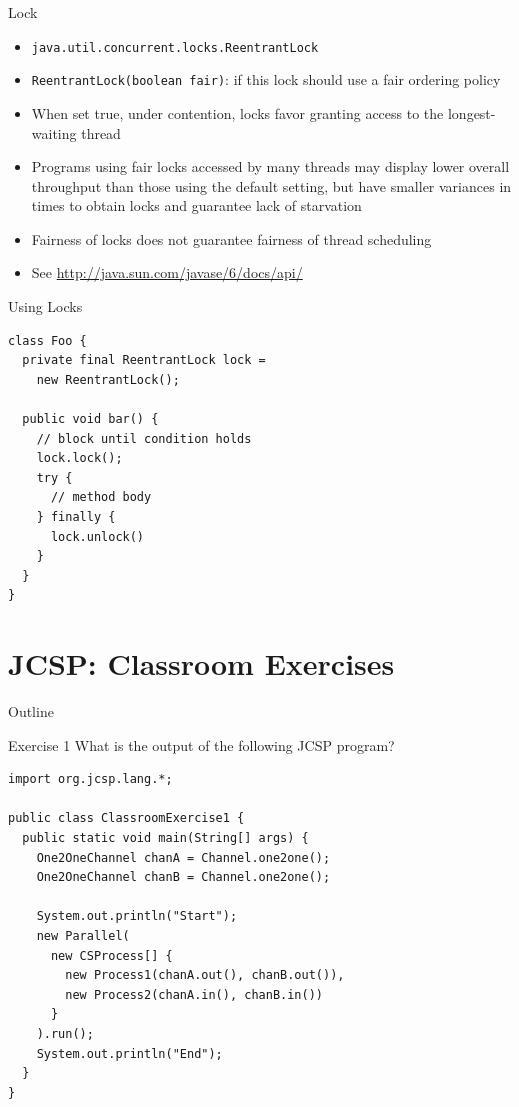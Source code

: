 \begin{frame}[fragile]{Lock}
  \begin{itemize}
  \item \lstinline!java.util.concurrent.locks.ReentrantLock!
  \item \lstinline!ReentrantLock(boolean fair)!: if this lock should
    use a fair ordering policy
  \item When set true, under contention, locks favor granting access
    to the longest-waiting thread
  \item Programs using fair locks accessed by many threads may display
    lower overall throughput than those using the default setting, but
    have smaller variances in times to obtain locks and guarantee lack
    of starvation
  \item Fairness of locks does not guarantee fairness of thread
    scheduling
  \item See \url{http://java.sun.com/javase/6/docs/api/}
  \end{itemize}
\end{frame}

\begin{frame}[fragile]{Using Locks}
  \begin{lstlisting}
class Foo {
  private final ReentrantLock lock = 
    new ReentrantLock();

  public void bar() {
    // block until condition holds
    lock.lock();
    try {
      // method body
    } finally {
      lock.unlock()
    }
  }
}
\end{lstlisting}
\end{frame}


\section{JCSP: Classroom Exercises}

\begin{frame}{Outline}
  \tableofcontents[current]
\end{frame}

\begin{frame}[fragile]{Exercise 1}
  What is the output of the following JCSP program?


\begin{lstlisting}[basicstyle=\fontsize{9}{11}\selectfont\ttfamily]
import org.jcsp.lang.*;

public class ClassroomExercise1 {
  public static void main(String[] args) {
    One2OneChannel chanA = Channel.one2one();
    One2OneChannel chanB = Channel.one2one();

    System.out.println("Start");
    new Parallel(
      new CSProcess[] { 
        new Process1(chanA.out(), chanB.out()),
        new Process2(chanA.in(), chanB.in()) 
      }
    ).run();
    System.out.println("End");
  }
}
\end{lstlisting}
\end{frame}

